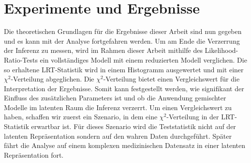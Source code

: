 \documentclass[%
thesis=student,%
coverpage=false,%
titlepage=false,%
headmarks=true, %
german,%
font=libertine, %
math=newpxtx, %
BCOR=5mm,%
coverBCOR=11mm%
]{tumbook}
\theoremstyle{break}
\begin{document}
\section{Experimente und Ergebnisse}
Die theoretischen Grundlagen für die Ergebnisse dieser Arbeit sind nun gegeben und es kann mit der Analyse fortgefahren werden. Um am Ende die Verzerrung der Inferenz zu messen, wird im Rahmen dieser Arbeit mithilfe des Likelihood-Ratio-Tests ein vollständiges Modell mit einem reduzierten Modell verglichen. Die so erhaltene LRT-Statistik wird in einem Histogramm ausgewertet und mit einer $\chi^2$-Verteilung abgeglichen. Die $\chi^2$-Verteilung bietet einen Vergleichswert für die Interpretation der Ergebnisse. Somit kann festgestellt werden, wie signifikant der Einfluss des zusätzlichen Parameters ist und ob die Anwendung gemischter Modelle im latenten Raum die Inferenz verzerrt.
Um einen Vergleichswert zu haben, schaffen wir zuerst ein Szenario, in dem eine $\chi^2$-Verteilung in der LRT-Statistik erwartbar ist. Für dieses Szenario wird die Teststatistik nicht auf der latenten Repräsentation sondern auf den wahren Daten durchgeführt. Später fährt die Analyse auf einem komplexen medizinischen Datensatz in einer latenten Repräsentation fort.
\end{document}
